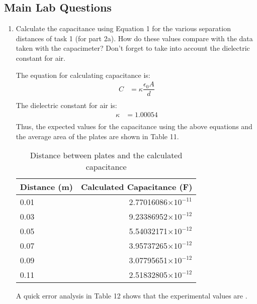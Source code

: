 \documentclass [12pt, letterpaper, twoside] {article}
\begin{document}
\subsection* {Main Lab Questions}
\begin{enumerate}
  \item Calculate the capacitance using Equation 1 for the various separation distances of task 1 (for part 2a). How do these values compare with the data taken with the capacimeter?  Don’t forget to take into account the dielectric constant for air.

  The equation for calculating capacitance is:
  \begin{equation*}
    \begin{split}
      C &= \kappa\dfrac{\epsilon_{0}A}{d} \\
    \end{split}
  \end{equation*}
  The dielectric constant for air is:
  \begin{equation*}
    \begin{split}
      \kappa &= 1.00054 \\
    \end{split} 
  \end{equation*}
  Thus, the expected values for the capacitance using the above equations  and the average area of the plates are shown in Table 11.
  \begin{table}
    \centering
    \begin{tabular}{| l | r |}
      \hline\hline
      Distance (m) & Calculated Capacitance (F) \\
      \hline
      0.01 & 2.77016086\(\times10^{-11}\) \\
      \hline
      0.03 & 9.23386952\(\times10^{-12}\) \\
      \hline
      0.05 & 5.54032171\(\times10^{-12}\) \\
      \hline
      0.07 & 3.95737265\(\times10^{-12}\) \\
      \hline
      0.09 & 3.07795651\(\times10^{-12}\) \\
      \hline
      0.11 & 2.51832805\(\times10^{-12}\) \\
      \hline\hline
    \end{tabular}
    \caption{Distance between plates and the calculated capacitance}
  \end{table}
  A quick error analysis in Table 12 shows that the experimental values are .
  \begin{table}
    \centering

\end{table}
\end{enumerate}
\end{document}
